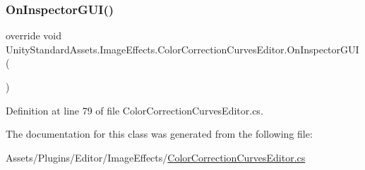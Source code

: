 \subsubsection{\texorpdfstring{On\+Inspector\+G\+U\+I()}{OnInspectorGUI()}}
{\footnotesize\ttfamily override void Unity\+Standard\+Assets.\+Image\+Effects.\+Color\+Correction\+Curves\+Editor.\+On\+Inspector\+G\+UI (\begin{DoxyParamCaption}{ }\end{DoxyParamCaption})}



Definition at line 79 of file Color\+Correction\+Curves\+Editor.\+cs.



The documentation for this class was generated from the following file\+:\begin{DoxyCompactItemize}
\item 
Assets/\+Plugins/\+Editor/\+Image\+Effects/\mbox{\hyperlink{_color_correction_curves_editor_8cs}{Color\+Correction\+Curves\+Editor.\+cs}}\end{DoxyCompactItemize}
